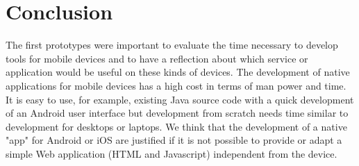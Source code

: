 \section{Conclusion}
The first prototypes were important to evaluate the time necessary to develop tools for mobile devices and to have a reflection about which service or application would be useful on these kinds of devices. The development of native applications for mobile devices has a high cost in terms of man power and time. It is easy to use, for example, existing Java source code with a quick development of an Android user interface but development from scratch needs time similar to development for desktops or laptops. We think that the development of a native "app" for Android or iOS are justified if it is not possible to provide or adapt a simple Web application (HTML and Javascript) independent from the device.


